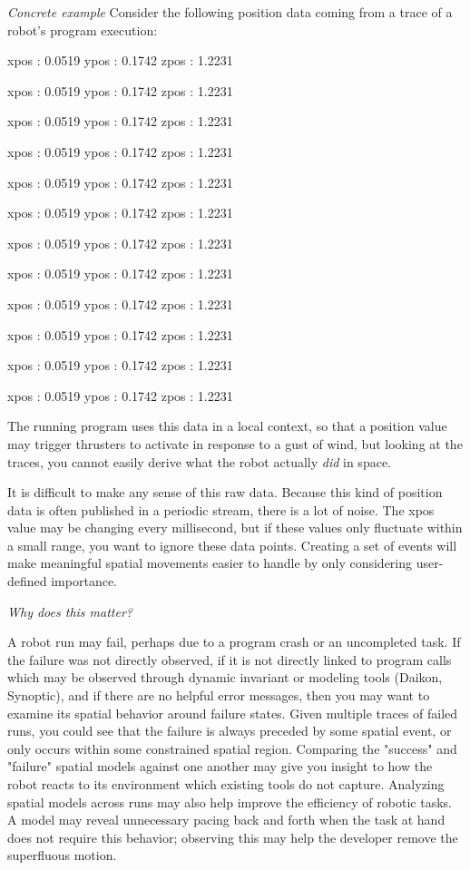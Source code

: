 \documentclass{article}
\begin{document}
\emph{Concrete example}
Consider the following position data coming from a trace of a robot's program execution:


xpos : 0.0519  ypos : 0.1742  zpos : 1.2231

xpos : 0.0519  ypos : 0.1742  zpos : 1.2231

xpos : 0.0519  ypos : 0.1742  zpos : 1.2231

xpos : 0.0519  ypos : 0.1742  zpos : 1.2231

xpos : 0.0519  ypos : 0.1742  zpos : 1.2231

xpos : 0.0519  ypos : 0.1742  zpos : 1.2231

xpos : 0.0519  ypos : 0.1742  zpos : 1.2231

xpos : 0.0519  ypos : 0.1742  zpos : 1.2231

xpos : 0.0519  ypos : 0.1742  zpos : 1.2231

xpos : 0.0519  ypos : 0.1742  zpos : 1.2231

xpos : 0.0519  ypos : 0.1742  zpos : 1.2231

xpos : 0.0519  ypos : 0.1742  zpos : 1.2231

The running program uses this data in a local context, so that a position value may trigger thrusters to activate in response to a gust of wind, but looking at the traces, you cannot easily derive what the robot actually \emph{did} in space.

It is difficult to make any sense of this raw data.  
Because this kind of position data is often published in a periodic stream, there is a lot of noise.  
The xpos value may be changing every millisecond, but if these values only fluctuate within a small range, you want to ignore these data points.  
Creating a set of events will make meaningful spatial movements easier to handle by only considering user-defined importance.  

\emph{Why does this matter?}  

A robot run may fail, perhaps due to a program crash or an uncompleted task.  
If the failure was not directly observed, if it is not directly linked to program calls which may be observed through dynamic invariant or modeling tools (Daikon, Synoptic), and if there are no helpful error messages, then you may want to examine its spatial behavior around failure states.
Given multiple traces of failed runs, you could see that the failure is always preceded by some spatial event, or only occurs within some constrained spatial region.
Comparing the "success" and "failure" spatial models against one another may give you insight to how the robot reacts to its environment which existing tools do not capture.
Analyzing spatial models across runs may also help improve the efficiency of robotic tasks.  
A model may reveal unnecessary pacing back and forth when the task at hand does not require this behavior; observing this may help the developer remove the superfluous motion.
\end{document}
